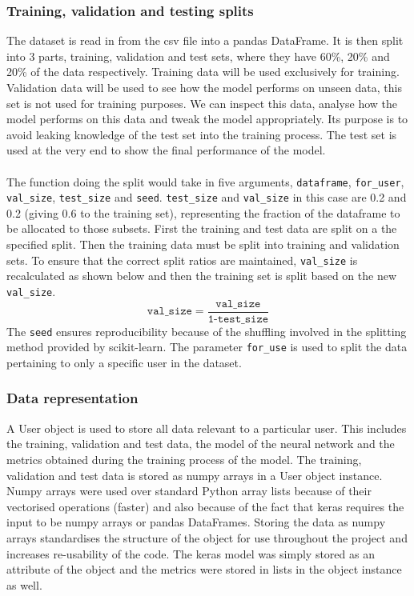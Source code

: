 \documentclass[12pt]{article}
\begin{document}
\subsubsection{Training, validation and testing splits}\label{subsec:split}
The dataset is read in from the csv file into a pandas DataFrame. It is then split into 3 parts, training, validation and test sets, where they have 60\%, 20\% and 20\% of the data respectively. Training data will be used exclusively for training. Validation data will be used to see how the model performs on unseen data, this set is not used for training purposes. We can inspect this data, analyse how the model performs on this data and tweak the model appropriately. Its purpose is to avoid leaking knowledge of the test set into the training process. The test set is used at the very end to show the final performance of the model. 
\\\\
The function doing the split would take in five arguments, \texttt{dataframe}, \texttt{for\_user}, \texttt{val\_size}, \texttt{test\_size} and \texttt{seed}. \texttt{test\_size} and \texttt{val\_size} in this case are 0.2 and 0.2 (giving 0.6 to the training set), representing the fraction of the dataframe to be allocated to those subsets. First the training and test data are split on a the specified split. Then the training data must be split into training and validation sets. To ensure that the correct split ratios are maintained, \texttt{val\_size} is recalculated as shown below and then the training set is split based on the new \texttt{val\_size}.
$$\texttt{val\_size} = \frac{\texttt{val\_size}}{\texttt{1-test\_size}}$$
The \texttt{seed} ensures reproducibility because of the shuffling involved in the splitting method provided by scikit-learn. The parameter \texttt{for\_use} is used to split the data pertaining to only a specific user in the dataset.
\subsubsection{Data representation}\label{subsubsec:datarep}
A User object is used to store all data relevant to a particular user. This includes the training, validation and test data, the model of the neural network and the metrics obtained during the training process of the model. The training, validation and test data is stored as numpy arrays in a User object instance. Numpy arrays were used over standard Python array lists because of their vectorised operations (faster) and also because of the fact that keras requires the input to be numpy arrays or pandas DataFrames. Storing the data as numpy arrays standardises the structure of the object for use throughout the project and increases re-usability of the code. The keras model was simply stored as an attribute of the object and the metrics were stored in lists in the object instance as well.
\end{document}
